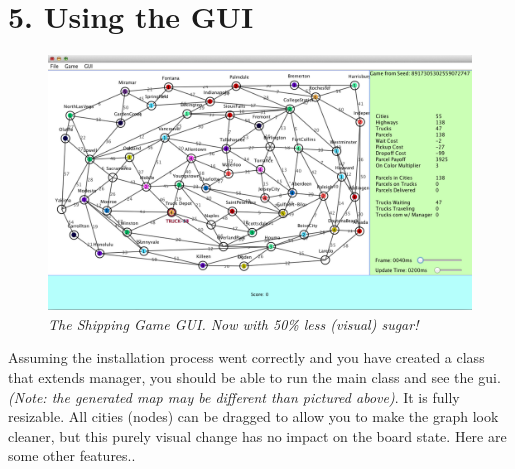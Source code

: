 \documentclass[11pt]{article}
\begin{document}
\section{5. Using the GUI}
\begin{figure}[h]
\centerline{\includegraphics[scale=0.45]{gui.png}} 
\caption{\em{The Shipping Game GUI. Now with 50\% less (visual) sugar!}}
\end{figure}

Assuming the installation process went correctly and you have created a class that extends manager, you should be able to run the main class and see the gui. {\em(Note: the generated map may be different than pictured above)}. It is fully resizable. All cities (nodes) can be dragged to allow you to make the graph look cleaner, but  this purely visual change has no impact on the board state. Here are some other features.. 
\end{document}
